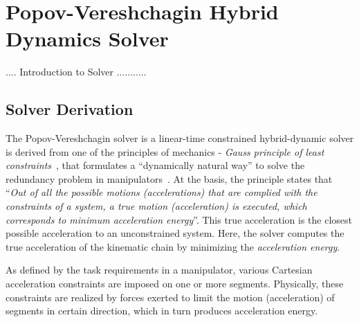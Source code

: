 \chapter{Popov-Vereshchagin Hybrid Dynamics Solver}
\label{chap:solver}

.... Introduction to Solver ...........


\section{Solver Derivation}
 
The Popov-Vereshchagin solver is a linear-time constrained hybrid-dynamic solver is derived from one of the principles of mechanics - \textit{Gauss principle of least constraints}~\cite{vereshchagin1989modeling}, that formulates a ``dynamically natural way'' to solve the redundancy problem in manipulators~\cite{bruyninckx2000gauss}. At the basis, the principle states that ``\textit{Out of all the possible motions (accelerations) that are complied with the constraints of a system, a true motion (acceleration) is executed, which corresponds to minimum acceleration energy}''. This true acceleration is the closest possible acceleration to an unconstrained system. Here, the solver computes the true acceleration of the kinematic chain by minimizing the \textit{acceleration energy}. 

 As defined by the task requirements in a manipulator, various Cartesian acceleration constraints are imposed on one or more segments. Physically, these constraints are realized by forces exerted to limit the motion (acceleration) of segments in certain direction, which in turn produces acceleration energy. 
 
 
